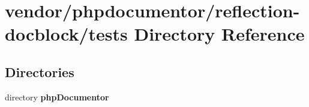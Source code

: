 \section{vendor/phpdocumentor/reflection-\/docblock/tests Directory Reference}
\label{dir_c5c3e4f607177dc54c12a4004db15e47}
\subsection*{Directories}
\begin{DoxyCompactItemize}
\item 
directory {\bf php\+Documentor}
\end{DoxyCompactItemize}
